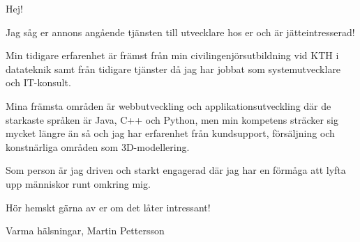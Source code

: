 \documentclass[11pt,stdletter,orderfromtodate,sigleft]{newlfm}
\begin{document}
\begin{newlfm}

Hej!

Jag såg er annons angående tjänsten till utvecklare hos er och är jätteintresserad!

Min tidigare erfarenhet är främst från min civilingenjörsutbildning vid KTH i datateknik samt från tidigare tjänster då jag har jobbat som systemutvecklare och IT-konsult. 

Mina främsta områden är webbutveckling och applikationsutveckling där de starkaste språken är Java, C++ och Python, men min kompetens sträcker sig mycket längre än så och jag har erfarenhet från kundsupport, försäljning och konstnärliga områden som 3D-modellering.

Som person är jag driven och starkt engagerad där jag har en förmåga att lyfta upp människor runt omkring mig.

Hör hemskt gärna av er om det låter intressant!

Varma hälsningar,
Martin Pettersson

\end{newlfm}
\end{document}
